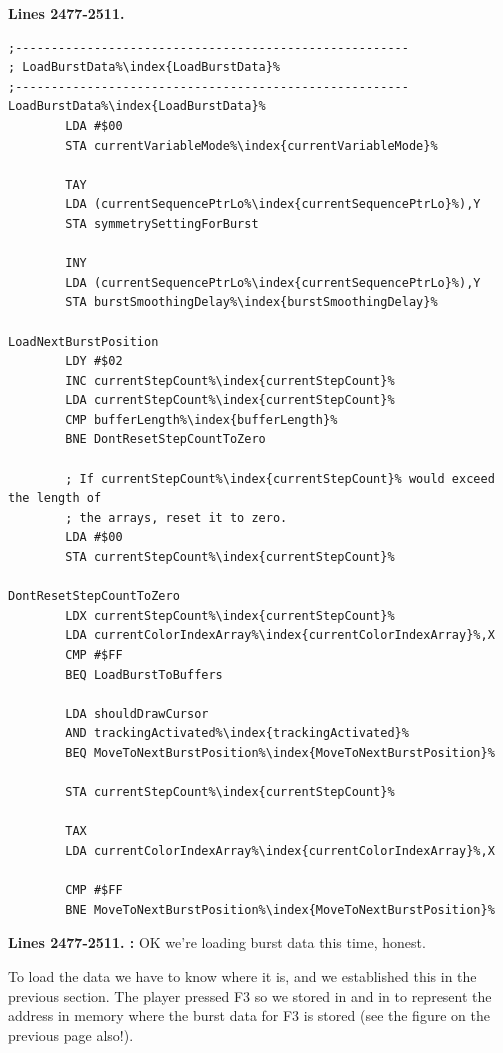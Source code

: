\clearpage
\textbf{Lines 2477-2511. }
\begin{lstlisting}[escapechar=\%]
;-------------------------------------------------------
; LoadBurstData%\index{LoadBurstData}%
;-------------------------------------------------------
LoadBurstData%\index{LoadBurstData}%    
        LDA #$00
        STA currentVariableMode%\index{currentVariableMode}%

        TAY 
        LDA (currentSequencePtrLo%\index{currentSequencePtrLo}%),Y
        STA symmetrySettingForBurst

        INY 
        LDA (currentSequencePtrLo%\index{currentSequencePtrLo}%),Y
        STA burstSmoothingDelay%\index{burstSmoothingDelay}%

LoadNextBurstPosition    
        LDY #$02
        INC currentStepCount%\index{currentStepCount}%
        LDA currentStepCount%\index{currentStepCount}%
        CMP bufferLength%\index{bufferLength}%
        BNE DontResetStepCountToZero

        ; If currentStepCount%\index{currentStepCount}% would exceed the length of
        ; the arrays, reset it to zero.
        LDA #$00
        STA currentStepCount%\index{currentStepCount}%

DontResetStepCountToZero
        LDX currentStepCount%\index{currentStepCount}%
        LDA currentColorIndexArray%\index{currentColorIndexArray}%,X
        CMP #$FF
        BEQ LoadBurstToBuffers

        LDA shouldDrawCursor
        AND trackingActivated%\index{trackingActivated}%
        BEQ MoveToNextBurstPosition%\index{MoveToNextBurstPosition}%

        STA currentStepCount%\index{currentStepCount}%

        TAX 
        LDA currentColorIndexArray%\index{currentColorIndexArray}%,X

        CMP #$FF
        BNE MoveToNextBurstPosition%\index{MoveToNextBurstPosition}%

\end{lstlisting}
\clearpage

\textbf{Lines 2477-2511. :} OK we're loading burst data this time, honest.

To load the data we have to know where it is, and we established this in the previous section. The player
pressed F3 so we stored  in  and  in 
to represent the address  in memory where the burst data for F3 is stored (see the figure on the previous
page also!).


